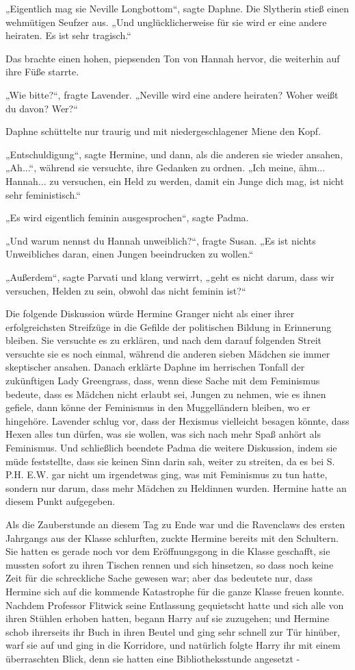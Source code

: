 {„Eigentlich mag sie Neville Longbottom“, sagte Daphne. Die Slytherin stieß einen wehmütigen Seufzer aus. „Und unglücklicherweise für sie wird er eine andere heiraten. Es ist sehr tragisch.“

Das brachte einen hohen, piepsenden Ton von Hannah hervor, die weiterhin auf ihre Füße starrte.

„Wie bitte?“, fragte Lavender. „Neville wird eine andere heiraten? Woher weißt du davon? Wer?“

Daphne schüttelte nur traurig und mit niedergeschlagener Miene den Kopf.

„Entschuldigung“, sagte Hermine, und dann, als die anderen sie wieder ansahen, „Ah...“, während sie versuchte, ihre Gedanken zu ordnen. „Ich meine, ähm... Hannah... zu versuchen, ein Held zu werden, damit ein Junge dich mag, ist nicht sehr feministisch.“

„Es wird eigentlich feminin ausgesprochen“, sagte Padma.

„Und warum nennst du Hannah unweiblich?“, fragte Susan. „Es ist nichts Unweibliches daran, einen Jungen beeindrucken zu wollen.“

„Außerdem“, sagte Parvati und klang verwirrt, „geht es nicht darum, dass wir versuchen, Helden zu sein, obwohl das nicht feminin ist?“

Die folgende Diskussion würde Hermine Granger nicht als einer ihrer erfolgreichsten Streifzüge in die Gefilde der politischen Bildung in Erinnerung bleiben. Sie versuchte es zu erklären, und nach dem darauf folgenden Streit versuchte sie es noch einmal, während die anderen sieben Mädchen sie immer skeptischer ansahen. Danach erklärte Daphne im herrischen Tonfall der zukünftigen Lady Greengrass, dass, wenn diese Sache mit dem Feminismus bedeute, dass es Mädchen nicht erlaubt sei, Jungen zu nehmen, wie es ihnen gefiele, dann könne der Feminismus in den Muggelländern bleiben, wo er hingehöre. Lavender schlug vor, dass der Hexismus vielleicht besagen könnte, dass Hexen alles tun dürfen, was sie wollen, was sich nach mehr Spaß anhört als Feminismus. Und schließlich beendete Padma die weitere Diskussion, indem sie müde feststellte, dass sie keinen Sinn darin sah, weiter zu streiten, da es bei S. P.H. E.W. gar nicht um irgendetwas ging, was mit Feminismus zu tun hatte, sondern nur darum, dass mehr Mädchen zu Heldinnen wurden. Hermine hatte an diesem Punkt aufgegeben.

Als die Zauberstunde an diesem Tag zu Ende war und die Ravenclaws des ersten Jahrgangs aus der Klasse schlurften, zuckte Hermine bereits mit den Schultern. Sie hatten es gerade noch vor dem Eröffnungsgong in die Klasse geschafft, sie mussten sofort zu ihren Tischen rennen und sich hinsetzen, so dass noch keine Zeit für die schreckliche Sache gewesen war; aber das bedeutete nur, dass Hermine sich auf die kommende Katastrophe für die ganze Klasse freuen konnte. Nachdem Professor Flitwick seine Entlassung gequietscht hatte und sich alle von ihren Stühlen erhoben hatten, begann Harry auf sie zuzugehen; und Hermine schob ihrerseits ihr Buch in ihren Beutel und ging sehr schnell zur Tür hinüber, warf sie auf und ging in die Korridore, und natürlich folgte Harry ihr mit einem überraschten Blick, denn sie hatten eine Bibliotheksstunde angesetzt -

}
